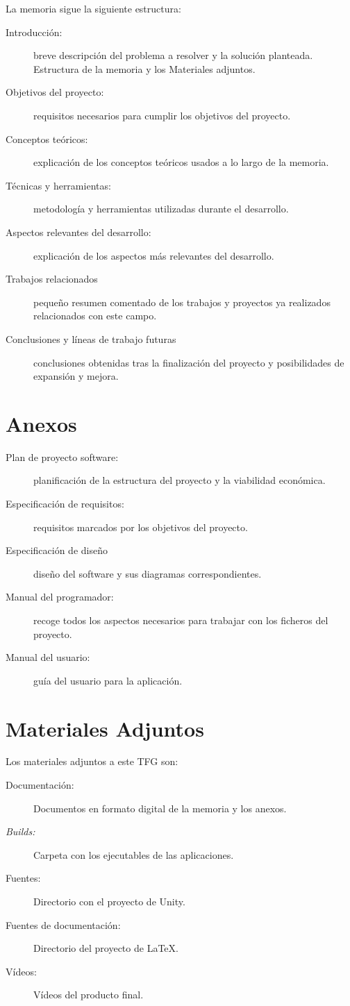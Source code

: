 La memoria sigue la siguiente estructura:
\begin{description}
	\item[Introducción:] breve descripción del problema a resolver y la solución planteada. Estructura de la memoria y los Materiales adjuntos.
	\item[Objetivos del proyecto:] requisitos necesarios para cumplir los objetivos del proyecto.
	\item[Conceptos teóricos:] explicación de los conceptos teóricos usados a lo largo de la memoria.
	\item[Técnicas y herramientas:] metodología y herramientas utilizadas durante el desarrollo.
	\item[Aspectos relevantes del desarrollo:] explicación de los aspectos más relevantes del desarrollo.
	\item[Trabajos relacionados] pequeño resumen comentado de los trabajos y proyectos ya realizados relacionados con este campo.
	\item[Conclusiones y líneas de trabajo futuras] conclusiones obtenidas tras la finalización del proyecto y posibilidades de expansión y mejora.
\end{description}

\section{Anexos}
\begin{description}
	\item[Plan de proyecto software:] planificación de la estructura del proyecto y la viabilidad económica.
	\item[Especificación de requisitos:] requisitos marcados por los objetivos del proyecto.
	\item[Especificación de diseño] diseño del software y sus diagramas correspondientes.
	\item[Manual del programador:] recoge todos los aspectos necesarios para trabajar con los ficheros del proyecto.
	\item[Manual del usuario:] guía del usuario para la aplicación.
	
\end{description}
\section{Materiales Adjuntos}

Los materiales adjuntos a este TFG son:
\begin{description}
	\item[Documentación:] Documentos en formato digital de la memoria y los anexos.
	\item[\textit{Builds:}] Carpeta con los ejecutables de las aplicaciones. 
	\item[Fuentes:] Directorio con el proyecto de Unity.
	\item[Fuentes de documentación:] Directorio del proyecto de \LaTeX.
	\item[Vídeos:] Vídeos del producto final.
\end{description}
